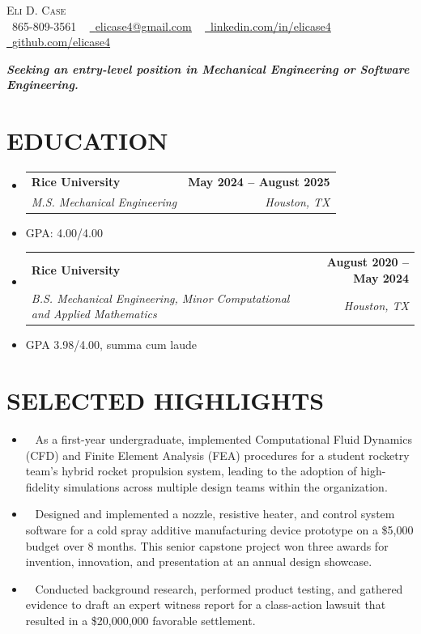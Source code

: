 \documentclass[letterpaper,11pt]{article}
\makeatletter
\newcommand{\resumeItem}[1]{
  \item \small{
    {#1 \vspace{-2pt}}
  }
}
\newcommand{\highlightItem}[1]{
  \item \textendash\ \small{
    {#1 \vspace{-2pt}}
  }
}
\newcommand{\resumeSubheading}[4]{
  \vspace{-2pt}\item
    \begin{tabular*}{1.0\textwidth}[t]{l@{\extracolsep{\fill}}r}
      \textbf{#1} & \textbf{\small #2} \\
      \textit{\small#3} & \textit{\small #4} \\
    \end{tabular*}\vspace{-7pt}
}
\newcommand{\resumeSubHeadingListStart}{\begin{itemize}[leftmargin=0.0in, label={}]}
\newcommand{\resumeSubHeadingListEnd}{\end{itemize}}
\makeatother
\begin{document}
\begin{center}
    {\large \scshape Eli D. Case} \\ \vspace{1pt}
    \small \raisebox{-0.1\height}\faPhone\ 865-809-3561 ~ \href{mailto:elicase4@gmail.com}{\raisebox{-0.2\height}\faEnvelope\  \underline{elicase4@gmail.com}} ~ 
    \href{https://linkedin.com/in/elicase4}{\raisebox{-0.2\height}\faLinkedin\ \underline{linkedin.com/in/elicase4}}  ~
    \href{https://github.com/elicase4}{\raisebox{-0.2\height}\faGithub\ \underline{github.com/elicase4}}
\end{center}

\begin{center}
  \vspace{4pt}
  \textit{\textbf{Seeking an entry-level position in Mechanical Engineering or Software Engineering.}}
  \vspace{-2pt}
\end{center}

\section{EDUCATION}

  \resumeSubHeadingListStart
    
    \resumeSubheading
      {Rice University}{May 2024 -- August 2025}
      {M.S. Mechanical Engineering}{Houston, TX}
      \resumeItem{GPA: 4.00/4.00}
    \resumeSubheading
      {Rice University}{August 2020 -- May 2024}
      {B.S. Mechanical Engineering, Minor Computational and Applied Mathematics}{Houston, TX}
      \resumeItem{GPA 3.98/4.00, summa cum laude}

  \resumeSubHeadingListEnd
\vspace{-16pt}

\section{SELECTED HIGHLIGHTS}
 \begin{itemize}[leftmargin=0.15in, label={}]
    \highlightItem{As a first-year undergraduate, implemented Computational Fluid Dynamics (CFD) and Finite Element Analysis (FEA) procedures for a student rocketry team's hybrid rocket propulsion system, leading to the adoption of high-fidelity simulations across multiple design teams within the organization.}

    \highlightItem{Designed and implemented a nozzle, resistive heater, and control system software for a cold spray additive manufacturing device prototype on a \$5,000 budget over 8 months. This senior capstone project won three awards for invention, innovation, and presentation at an annual design showcase.}

    \highlightItem{Conducted background research, performed product testing, and gathered evidence to draft an expert witness report for a class-action lawsuit that resulted in a \$20,000,000 favorable settlement.} 
    
\end{itemize}
\vspace{-16pt}
\end{document}
